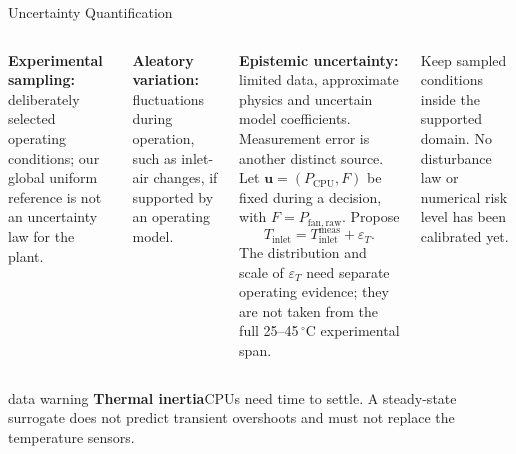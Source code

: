 \begin{frame}{Uncertainty Quantification}
  \begin{columns}[T,onlytextwidth]
      \footnotesize
      \textbf{Experimental sampling:} deliberately selected operating conditions;
      our global uniform reference is not an uncertainty law for the plant.\par
      \smallskip
      \textbf{Aleatory variation:} fluctuations during operation, such as inlet-air
      changes, if supported by an operating model.\par
      \smallskip
      \textbf{Epistemic uncertainty:} limited data, approximate physics and uncertain
      model coefficients. Measurement error is another distinct source.
      \footnotesize
      Let $\mathbf u=(P_{\mathrm{CPU}},F)$ be fixed during a decision,
      with $F=P_{\mathrm{fan,raw}}$. Propose
      \[
        T_{\mathrm{inlet}}=T_{\mathrm{inlet}}^{\mathrm{meas}}+\varepsilon_T.
      \]
      The distribution and scale of $\varepsilon_T$ need separate operating evidence;
      they are not taken from the full 25--45\,${}^\circ$C experimental span.\par
      \smallskip
      Keep sampled conditions inside the supported domain. No disturbance law
      or numerical risk level has been calibrated yet.
  \end{columns}
  \medskip
  \begin{beamercolorbox}[sep=1.5mm,wd=\textwidth]{data warning}
    \footnotesize
    \textbf{Thermal inertia}\quad CPUs need time to settle. A steady-state surrogate
    does not predict transient overshoots and must not replace the temperature sensors.
  \end{beamercolorbox}
\end{frame}

